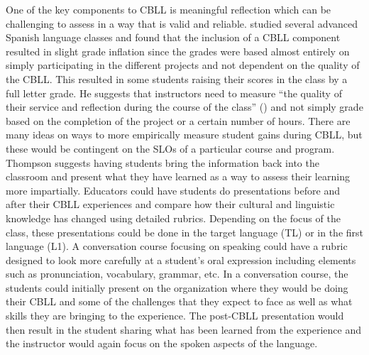 \documentclass[output=paper]{langscibook}
\begin{document}
One of the key components to CBLL is meaningful reflection which can be challenging to assess in a way that is valid and reliable. \citet{Thompson2012} studied several advanced Spanish language classes and found that the inclusion of a CBLL component resulted in slight grade inflation since the grades were based almost entirely on simply participating in the different projects and not dependent on the quality of the CBLL. This resulted in some students raising their scores in the class by a full letter grade. He suggests that instructors need to measure “the quality of their service and reflection during the course of the class” (\citeyear[112]{Thompson2012}) and not simply grade based on the completion of the project or a certain number of hours. There are many ideas on ways to more empirically measure student gains during CBLL, but these would be contingent on the SLOs of a particular course and program. Thompson suggests having students bring the information back into the classroom and present what they have learned as a way to assess their learning more impartially. Educators could have students do presentations before and after their CBLL experiences and compare how their cultural and linguistic knowledge has changed using detailed rubrics. Depending on the focus of the class, these presentations could be done in the target language (TL) or in the first language (L1). A conversation course focusing on speaking could have a rubric designed to look more carefully at a student’s oral expression including elements such as pronunciation, vocabulary, grammar, etc. In a conversation course, the students could initially present on the organization where they would be doing their CBLL and some of the challenges that they expect to face as well as what skills they are bringing to the experience. The post-CBLL presentation would then result in the student sharing what has been learned from the experience and the instructor would again focus on the spoken aspects of the language.
\end{document}
